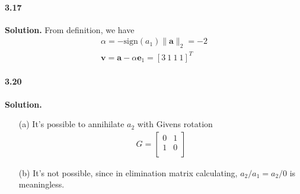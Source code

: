 \documentclass[a4paper]{book}
\newenvironment{solution}%
{\noindent\textbf{Solution.}}%
{\qedhere}
\numberwithin{equation}{chapter}
\theoremstyle{definition}
\begin{document}
\paragraph*{3.17 }
\begin{solution}
    From definition, we have 
    \begin{align*}
        \alpha = - \text{sign} (a_1)\|\bm a\|_2 = -2 \\
        \bm v = \bm a - \alpha \bm e_1 = [3\ 1\ 1\ 1]^T
    \end{align*}
\end{solution}
\paragraph*{3.20 }
\begin{solution}\begin{itemize}
        \item [(a)] It's possible to annihilate $a_2$ with Givens rotation
        \begin{align*}
            G = \left[
                \begin{array}{cc}
                    0 & 1 \\
                    1 & 0 \\
                \end{array}
            \right]
        \end{align*}
        \item [(b)] It's not possible, since in  elimination matrix
        calculating, $a_2 / a_1 = a_2 
        / 0$ is meaningless.
    \end{itemize}
\end{solution}
    
\end{document}
